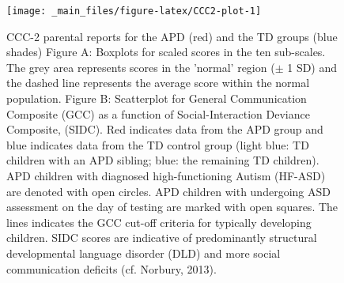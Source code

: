 \documentclass[a4paper, twoside]{templates/ociamthesis}
\begin{document}
\begin{figure}

{\centering \texttt{[image: \_main\_files/figure-latex/CCC2-plot-1]} 

}

\caption{CCC-2 parental reports for the APD (red) and the TD groups (blue shades) Figure A: Boxplots for scaled scores in the ten sub-scales. The grey area represents scores in the 'normal' region ($\pm$ 1 SD) and the dashed line represents the average score within the normal population. Figure B: Scatterplot for General Communication Composite (GCC) as a function of Social-Interaction Deviance Composite, (SIDC). Red indicates data from the APD group and blue indicates data from the TD control group (light blue: TD children with an APD sibling; blue: the remaining TD children). APD children with diagnosed high-functioning Autism (HF-ASD) are denoted with open circles. APD children with undergoing ASD assessment on the day of testing are marked with open squares. The lines indicates the GCC cut-off criteria for typically developing children. SIDC scores are indicative of predominantly structural developmental language disorder (DLD) and more social communication deficits (cf. Norbury, 2013).}\label{fig:CCC2-plot}
\end{figure}
\end{document}
